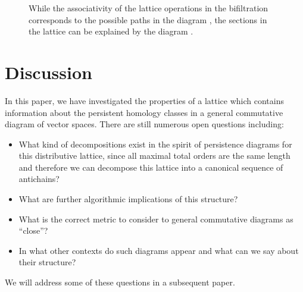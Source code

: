 \documentclass[10pt]{amsart}
\begin{document}
\begin{figure}
{
%     
\label{exsections1}
}
\caption{\label{fig:sections}
While the associativity of the lattice operations in the bifiltration corresponds to the possible paths in the diagram , the sections in the lattice can be explained by the diagram .
}
\label{exsections}
\end{figure}








\section{Discussion}
\label{discussion}


In this paper, we have investigated the properties of a lattice which contains information about the persistent homology classes in a general commutative diagram of vector spaces. There are still numerous open questions including:
\begin{itemize}
\item What kind of decompositions exist in the spirit of persistence diagrams for this distributive lattice, since all maximal total orders are the same length and therefore we can decompose this lattice into a canonical sequence of antichains?
\item What are further algorithmic implications of this structure?
\item What is the correct metric to consider to general commutative diagrams as ``close''?
\item In what other contexts do such diagrams appear and what can we say about their structure?
\end{itemize}
We will address some of these questions in a subsequent paper. 
\end{document}
